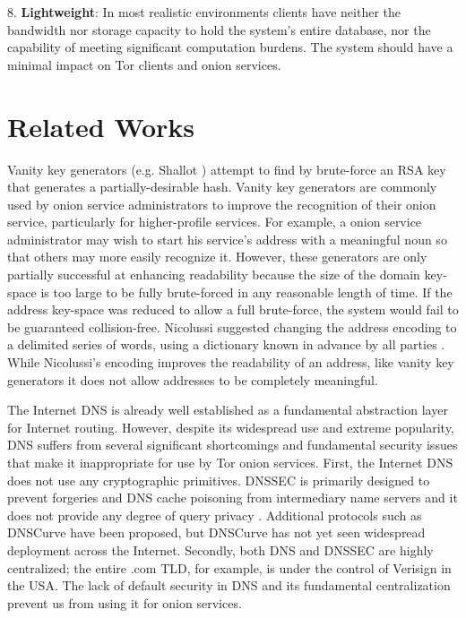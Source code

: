 \documentclass[USenglish,oneside,twocolumn]{article}
\begin{document}
8. \textbf{Lightweight}: In most realistic environments clients have neither the bandwidth nor storage capacity to hold the system's entire database, nor the capability of meeting significant computation burdens. The system should have a minimal impact on Tor clients and onion services.

\section{Related Works}
\label{sec:RelatedWorks}

Vanity key generators (e.g. Shallot \cite{KatmagicShallot}) attempt to find by brute-force an RSA key that generates a partially-desirable hash. Vanity key generators are commonly used by onion service administrators to improve the recognition of their onion service, particularly for higher-profile services. For example, a onion service administrator may wish to start his service's address with a meaningful noun so that others may more easily recognize it. However, these generators are only partially successful at enhancing readability because the size of the domain key-space is too large to be fully brute-forced in any reasonable length of time. If the address key-space was reduced to allow a full brute-force, the system would fail to be guaranteed collision-free. Nicolussi suggested changing the address encoding to a delimited series of words, using a dictionary known in advance by all parties \cite{nicolussi2011human}. While Nicolussi's encoding improves the readability of an address, like vanity key generators it does not allow addresses to be completely meaningful.

The Internet DNS is already well established as a fundamental abstraction layer for Internet routing. However, despite its widespread use and extreme popularity, DNS suffers from several significant shortcomings and fundamental security issues that make it inappropriate for use by Tor onion services. First, the Internet DNS does not use any cryptographic primitives. DNSSEC is primarily designed to prevent forgeries and DNS cache poisoning from intermediary name servers and it does not provide any degree of query privacy \cite{wachs2014censorship}. Additional protocols such as DNSCurve \cite{bernstein2009dnscurve} have been proposed, but DNSCurve has not yet seen widespread deployment across the Internet. Secondly, both DNS and DNSSEC are highly centralized; the entire .com TLD, for example, is under the control of Verisign in the USA. The lack of default security in DNS and its fundamental centralization prevent us from using it for onion services.
\end{document}
